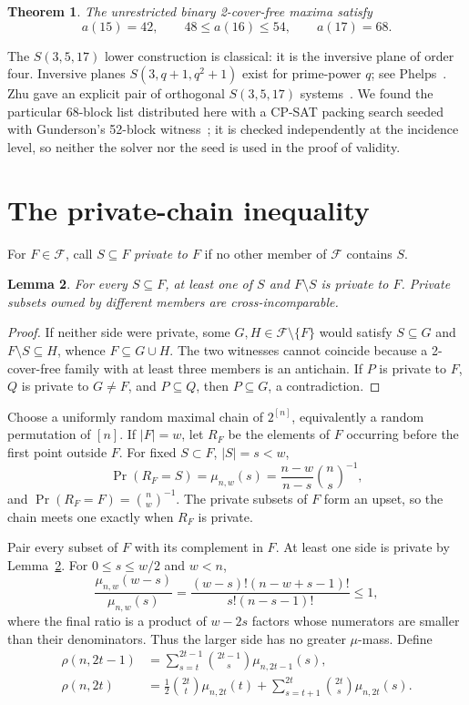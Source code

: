 \documentclass[11pt]{article}
\newtheorem{theorem}{Theorem}
\newtheorem{lemma}[theorem]{Lemma}
\newcommand{\binomc}[2]{\binom{#1}{#2}}
\newcommand{\F}{\mathcal F}
\begin{document}
\begin{theorem}\label{thm:main}
The unrestricted binary 2-cover-free maxima satisfy
\[
 a(15)=42,\qquad 48\leq a(16)\leq54,\qquad a(17)=68.
\]
\end{theorem}

The $S(3,5,17)$ lower construction is classical: it is the inversive plane of
order four.  Inversive planes $S(3,q+1,q^2+1)$ exist for prime-power $q$;
see Phelps~\cite{phelps1981}.  Zhu gave an explicit pair of orthogonal
$S(3,5,17)$ systems~\cite{zhu1980}.  We found the particular 68-block list
distributed here with a CP-SAT packing search seeded with Gunderson's
52-block witness~\cite{gunderson-a286874}; it is checked
independently at the incidence level, so neither the solver nor the seed is
used in the proof of validity.

\section{The private-chain inequality}

For $F\in\F$, call $S\subseteq F$ \emph{private to $F$} if no other member
of $\F$ contains $S$.

\begin{lemma}\label{lem:private}
For every $S\subseteq F$, at least one of $S$ and $F\setminus S$ is private
to $F$.  Private subsets owned by different members are cross-incomparable.
\end{lemma}

\begin{proof}
If neither side were private, some $G,H\in\F\setminus\{F\}$ would satisfy
$S\subseteq G$ and $F\setminus S\subseteq H$, whence $F\subseteq G\cup H$.
The two witnesses cannot coincide because a 2-cover-free family with at least
three members is an antichain.  If $P$ is private to $F$, $Q$ is private to
$G\neq F$, and $P\subseteq Q$, then $P\subseteq G$, a contradiction.
\end{proof}

Choose a uniformly random maximal chain of $2^{[n]}$, equivalently a random
permutation of $[n]$.  If $|F|=w$, let $R_F$ be the elements of $F$ occurring
before the first point outside $F$.  For fixed $S\subset F$, $|S|=s<w$,
\[
 \Pr(R_F=S)=\mu_{n,w}(s)
 =\frac{n-w}{n-s}\binomc ns^{-1},
\]
and $\Pr(R_F=F)=\binomc nw^{-1}$.  The private subsets of $F$ form an upset,
so the chain meets one exactly when $R_F$ is private.

Pair every subset of $F$ with its complement in $F$.  At least one side is
private by Lemma~\ref{lem:private}.  For $0\leq s\leq w/2$ and $w<n$,
\[
 \frac{\mu_{n,w}(w-s)}{\mu_{n,w}(s)}
 =\frac{(w-s)!(n-w+s-1)!}{s!(n-s-1)!}\leq1,
\]
where the final ratio is a product of $w-2s$ factors whose numerators are
smaller than their denominators.  Thus the larger side has no greater
$\mu$-mass.  Define
\begin{align*}
 \rho(n,2t-1)
 &=\sum_{s=t}^{2t-1}\binomc{2t-1}s\mu_{n,2t-1}(s),\\
 \rho(n,2t)
 &=\frac12\binomc{2t}t\mu_{n,2t}(t)
   +\sum_{s=t+1}^{2t}\binomc{2t}s\mu_{n,2t}(s).
\end{align*}
\end{document}
